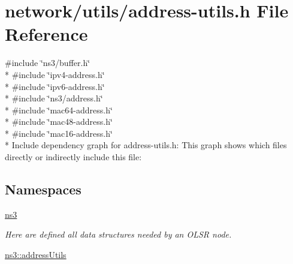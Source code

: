 \hypertarget{address-utils_8h}{}\section{network/utils/address-\/utils.h File Reference}
\label{address-utils_8h}
{\ttfamily \#include \char`\"{}ns3/buffer.\+h\char`\"{}}\\*
{\ttfamily \#include \char`\"{}ipv4-\/address.\+h\char`\"{}}\\*
{\ttfamily \#include \char`\"{}ipv6-\/address.\+h\char`\"{}}\\*
{\ttfamily \#include \char`\"{}ns3/address.\+h\char`\"{}}\\*
{\ttfamily \#include \char`\"{}mac64-\/address.\+h\char`\"{}}\\*
{\ttfamily \#include \char`\"{}mac48-\/address.\+h\char`\"{}}\\*
{\ttfamily \#include \char`\"{}mac16-\/address.\+h\char`\"{}}\\*
Include dependency graph for address-\/utils.h\+:
This graph shows which files directly or indirectly include this file\+:
\subsection*{Namespaces}
\begin{DoxyCompactItemize}
\item 
 \hyperlink{namespacens3}{ns3}
\begin{DoxyCompactList}\small\item\em Here are defined all data structures needed by an O\+L\+SR node. \end{DoxyCompactList}\item 
 \hyperlink{namespacens3_1_1addressUtils}{ns3\+::address\+Utils}
\end{DoxyCompactItemize}
